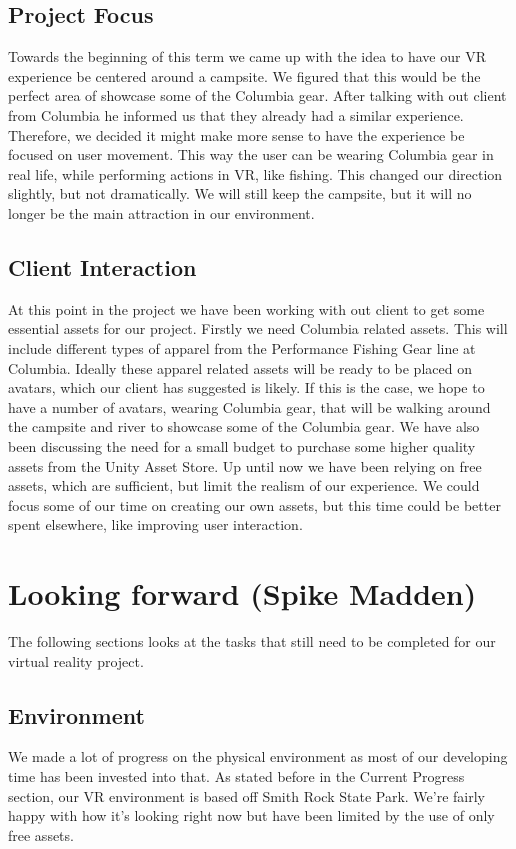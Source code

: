 \documentclass[10pt,journal,compsoc,onecolumn, draftclsnofoot]{IEEEtran}
\begin{document}
\subsection{Project Focus}
Towards the beginning of this term we came up with the idea to have our VR experience be centered around a campsite.
We figured that this would be the perfect area of showcase some of the Columbia gear.
After talking with out client from Columbia he informed us that they already had a similar experience.
Therefore, we decided it might make more sense to have the experience be focused on user movement.
This way the user can be wearing Columbia gear in real life, while performing actions in VR, like fishing.
This changed our direction slightly, but not dramatically.
We will still keep the campsite, but it will no longer be the main attraction in our environment.

\subsection{Client Interaction}
At this point in the project we have been working with out client to get some essential assets for our project.
Firstly we need Columbia related assets.
This will include different types of apparel from the Performance Fishing Gear line at Columbia.
Ideally these apparel related assets will be ready to be placed on avatars, which our client has suggested is likely.
If this is the case, we hope to have a number of avatars, wearing Columbia gear, that will be walking around the campsite and river to showcase some of the Columbia gear.
We have also been discussing the need for a small budget to purchase some higher quality assets from the Unity Asset Store.
Up until now we have been relying on free assets, which are sufficient, but limit the realism of our experience.
We could focus some of our time on creating our own assets, but this time could be better spent elsewhere, like improving user interaction.

\section{Looking forward (Spike Madden)}
The following sections looks at the tasks that still need to be completed for our virtual reality project.

\subsection{Environment}
We made a lot of progress on the physical environment as most of our developing time has been invested into that. As stated before in the Current Progress section, our VR environment is based off Smith Rock State Park. We're fairly happy with how it's looking right now but have been limited by the use of only free assets.
\end{document}
